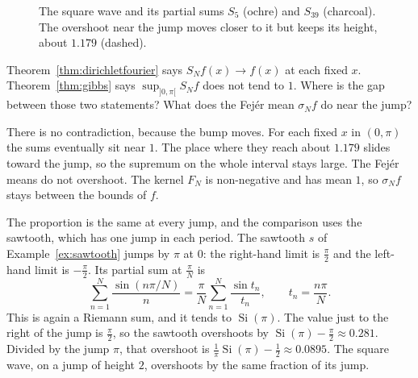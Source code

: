 \begin{figure}[ht]
\centering
{}
\caption{The square wave and its partial sums $S_5$ (ochre) and $S_{39}$ (charcoal). The overshoot near the jump moves closer to it but
keeps its height, about $1.179$ (dashed).}
\label{fig:gibbs}
\end{figure}

\begin{think}
Theorem~\ref{thm:dirichletfourier} says $S_Nf(x)\to f(x)$ at each fixed $x$. Theorem~\ref{thm:gibbs} says $\sup_{]0,\pi[}S_Nf$ does not tend to $1$. Where is the gap between those two statements? What does the Fej\'er mean $\sigma_Nf$ do near the jump?
\end{think}

There is no contradiction, because the bump moves. For each fixed $x$ in $(0,\pi)$ the sums eventually sit near $1$. The place where they reach about $1.179$ slides toward the jump, so the supremum on the whole interval stays large. The Fej\'er means do not overshoot. The kernel $F_N$ is non-negative and has mean $1$, so $\sigma_Nf$ stays between the bounds of $f$.

The proportion is the same at every jump, and the comparison uses the sawtooth, which has one jump in each period. The sawtooth $s$ of Example~\ref{ex:sawtooth} jumps by $\pi$ at $0$: the right-hand limit is $\frac\pi2$ and the left-hand limit is $-\frac\pi2$. Its partial sum at $\frac\pi N$ is
\[
\sum_{n=1}^N\frac{\sin(n\pi/N)}n=\frac\pi N\sum_{n=1}^N\frac{\sin t_n}{t_n},\qquad t_n=\frac{n\pi}N.
\]
This is again a Riemann sum, and it tends to $\operatorname{Si}(\pi)$. The value just to the right of the jump is $\frac\pi2$, so the sawtooth overshoots by $\operatorname{Si}(\pi)-\frac\pi2\approx0.281$. Divided by the jump $\pi$, that overshoot is $\frac1\pi\operatorname{Si}(\pi)-\frac12\approx0.0895$. The square wave, on a jump of height $2$, overshoots by the same fraction of its jump.


